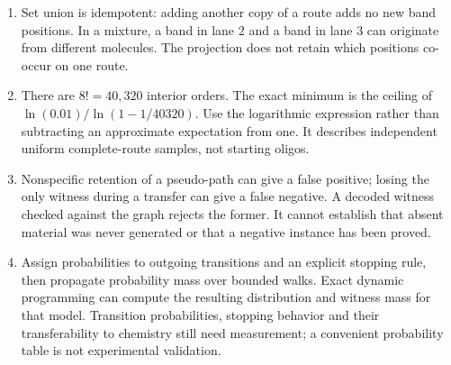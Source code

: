 \begin{enumerate}
\item Set union is idempotent: adding another copy of a route adds no new band positions. In a mixture, a band in lane 2 and a band in lane 3 can originate from different molecules. The projection does not retain which positions co-occur on one route.
\item There are $8!=40{,}320$ interior orders. The exact minimum is the ceiling of $\ln(0.01)/\ln(1-1/40320)$. Use the logarithmic expression rather than subtracting an approximate expectation from one. It describes independent uniform complete-route samples, not starting oligos.
\item Nonspecific retention of a pseudo-path can give a false positive; losing the only witness during a transfer can give a false negative. A decoded witness checked against the graph rejects the former. It cannot establish that absent material was never generated or that a negative instance has been proved.
\item Assign probabilities to outgoing transitions and an explicit stopping rule, then propagate probability mass over bounded walks. Exact dynamic programming can compute the resulting distribution and witness mass for that model. Transition probabilities, stopping behavior and their transferability to chemistry still need measurement; a convenient probability table is not experimental validation.
\end{enumerate}
